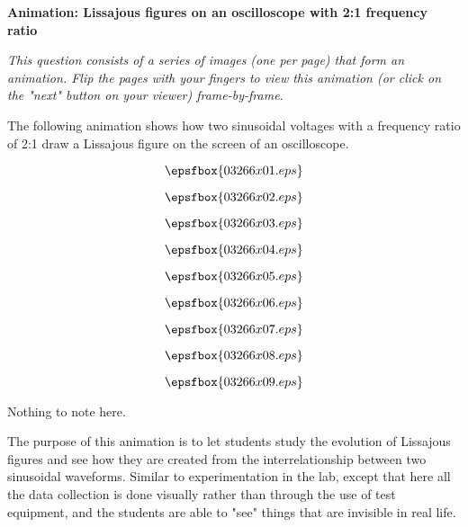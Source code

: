 

\centerline{\bf Animation: Lissajous figures on an oscilloscope with 2:1 frequency ratio}

\vskip 10pt

{\it This question consists of a series of images (one per page) that form an animation.  Flip the pages with your fingers to view this animation (or click on the "next" button on your viewer) frame-by-frame.}

\vskip 10pt

The following animation shows how two sinusoidal voltages with a frequency ratio of 2:1 draw a Lissajous figure on the screen of an oscilloscope.

\vfil \eject
$$\epsfbox{03266x01.eps}$$

\vfil \eject
$$\epsfbox{03266x02.eps}$$

\vfil \eject
$$\epsfbox{03266x03.eps}$$

\vfil \eject
$$\epsfbox{03266x04.eps}$$

\vfil \eject
$$\epsfbox{03266x05.eps}$$

\vfil \eject
$$\epsfbox{03266x06.eps}$$

\vfil \eject
$$\epsfbox{03266x07.eps}$$

\vfil \eject
$$\epsfbox{03266x08.eps}$$

\vfil \eject
$$\epsfbox{03266x09.eps}$$


\vfil \eject







Nothing to note here.







The purpose of this animation is to let students study the evolution of Lissajous figures and see how they are created from the interrelationship between two sinusoidal waveforms.  Similar to experimentation in the lab, except that here all the data collection is done visually rather than through the use of test equipment, and the students are able to "see" things that are invisible in real life.





